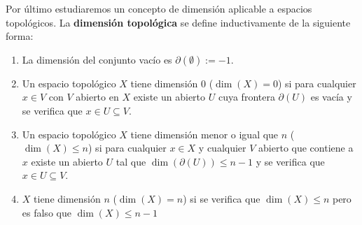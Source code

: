 Por último estudiaremos un concepto de dimensión aplicable a espacios topológicos. La \textbf{dimensión topológica} se define inductivamente de la siguiente forma:

\begin{enumerate}
\item La dimensión del conjunto vacío es $\partial(\emptyset):=-1$.
\item Un espacio topológico $X$ tiene dimensión 0 ($\dim(X)=0$) si para cualquier $x\in V$ con $V$ abierto en $X$ existe un abierto $U$ cuya frontera $\partial(U)$ es vacía y se verifica que $x\in U\subseteq V$.

\item Un espacio topológico $X$ tiene dimensión menor o igual que $n$ ($\dim(X)\leq n$) si para cualquier $x\in X$ y cualquier $V$ abierto que contiene a $x$ existe un abierto $U$ tal que $\dim(\partial(U))\leq n-1$ y se verifica que $x\in U\subseteq V$. 

\item $X$ tiene dimensión $n$ ($\dim(X)=n$) si se verifica que $\dim(X)\leq n$ pero es falso que $\dim(X)\leq n-1$
\end{enumerate}

